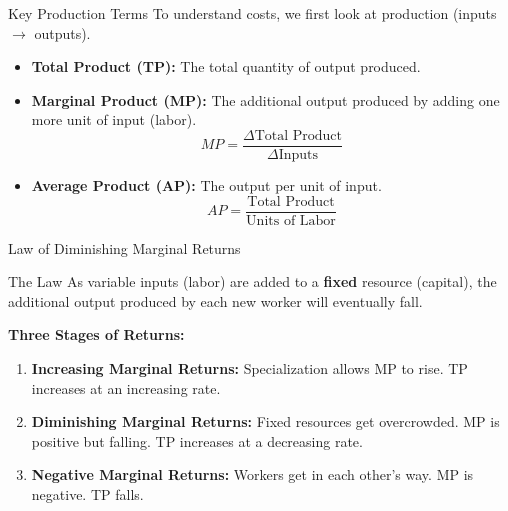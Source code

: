\documentclass[aspectratio=169]{beamer}
\begin{document}
\begin{frame}{Key Production Terms}
    To understand costs, we first look at production (inputs $\rightarrow$ outputs).
    
    \begin{itemize}
        \item \textbf{Total Product (TP):} The total quantity of output produced.
        \item \textbf{Marginal Product (MP):} The additional output produced by adding one more unit of input (labor).
        \[ MP = \frac{\Delta \text{Total Product}}{\Delta \text{Inputs}} \]
        \item \textbf{Average Product (AP):} The output per unit of input.
        \[ AP = \frac{\text{Total Product}}{\text{Units of Labor}} \]
    \end{itemize}
\end{frame}

\begin{frame}{Law of Diminishing Marginal Returns}
    \begin{alertblock}{The Law}
        As variable inputs (labor) are added to a \textbf{fixed} resource (capital), the additional output produced by each new worker will eventually fall.
    \end{alertblock}

    \textbf{Three Stages of Returns:}
    \begin{enumerate}
        \item \textbf{Increasing Marginal Returns:} Specialization allows MP to rise. TP increases at an increasing rate.
        \item \textbf{Diminishing Marginal Returns:} Fixed resources get overcrowded. MP is positive but falling. TP increases at a decreasing rate.
        \item \textbf{Negative Marginal Returns:} Workers get in each other's way. MP is negative. TP falls.
    \end{enumerate}
\end{frame}
\end{document}
